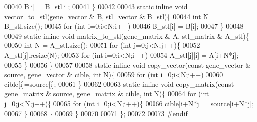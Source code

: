 \begin{DoxyCode}
00040       B[i] = B\_stl[i];
00041   \}
00042 
00043   \textcolor{keyword}{static} \textcolor{keyword}{inline} \textcolor{keywordtype}{void} vector\_to\_stl(gene\_vector & B, stl\_vector & B\_stl)\{
00044     \textcolor{keywordtype}{int} N = B\_stl.size();
00045     \textcolor{keywordflow}{for} (\textcolor{keywordtype}{int} i=0;i<N;i++)
00046       B\_stl[i] = B[i];
00047   \}
00048 
00049   \textcolor{keyword}{static} \textcolor{keyword}{inline} \textcolor{keywordtype}{void} matrix\_to\_stl(gene\_matrix & A, stl\_matrix & A\_stl)\{
00050     \textcolor{keywordtype}{int} N = A\_stl.size();
00051     \textcolor{keywordflow}{for} (\textcolor{keywordtype}{int} j=0;j<N;j++)\{
00052       A\_stl[j].resize(N);
00053       \textcolor{keywordflow}{for} (\textcolor{keywordtype}{int} i=0;i<N;i++)
00054         A\_stl[j][i] = A[i+N*j];
00055     \}
00056   \}
00057 
00058   \textcolor{keyword}{static} \textcolor{keyword}{inline} \textcolor{keywordtype}{void} copy\_vector(\textcolor{keyword}{const} gene\_vector & source, gene\_vector & cible, \textcolor{keywordtype}{int} N)\{
00059     \textcolor{keywordflow}{for} (\textcolor{keywordtype}{int} i=0;i<N;i++)
00060       cible[i]=source[i];
00061   \}
00062 
00063   \textcolor{keyword}{static} \textcolor{keyword}{inline} \textcolor{keywordtype}{void} copy\_matrix(\textcolor{keyword}{const} gene\_matrix & source, gene\_matrix & cible, \textcolor{keywordtype}{int} N)\{
00064     \textcolor{keywordflow}{for} (\textcolor{keywordtype}{int} j=0;j<N;j++)\{
00065       \textcolor{keywordflow}{for} (\textcolor{keywordtype}{int} i=0;i<N;i++)\{
00066         cible[i+N*j] = source[i+N*j];
00067       \}
00068     \}
00069   \}
00070 
00071 \};
00072 
00073 \textcolor{preprocessor}{#endif}
\end{DoxyCode}
